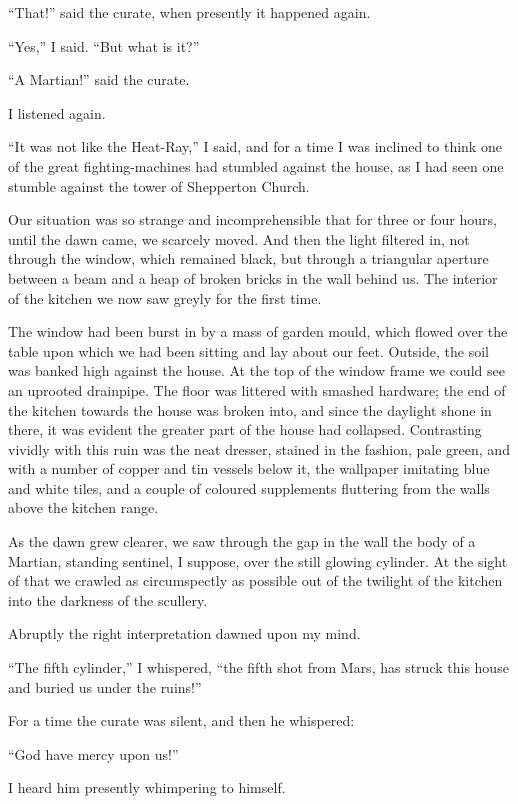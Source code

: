 ``That!'' said the curate, when presently it happened again.

``Yes,'' I said. ``But what is it?''

``A Martian!'' said the curate.

I listened again.

``It was not like the Heat-Ray,'' I said, and for a time I was
inclined to think one of the great fighting-machines had stumbled
against the house, as I had seen one stumble against the tower of
Shepperton Church.

Our situation was so strange and incomprehensible that for three or
four hours, until the dawn came, we scarcely moved. And then the
light filtered in, not through the window, which remained black,
but through a triangular aperture between a beam and a heap of
broken bricks in the wall behind us. The interior of the kitchen we
now saw greyly for the first time.

The window had been burst in by a mass of garden mould, which
flowed over the table upon which we had been sitting and lay about
our feet. Outside, the soil was banked high against the house. At
the top of the window frame we could see an uprooted drainpipe. The
floor was littered with smashed hardware; the end of the kitchen
towards the house was broken into, and since the daylight shone in
there, it was evident the greater part of the house had collapsed.
Contrasting vividly with this ruin was the neat dresser, stained in
the fashion, pale green, and with a number of copper and tin
vessels below it, the wallpaper imitating blue and white tiles, and
a couple of coloured supplements fluttering from the walls above
the kitchen range.

As the dawn grew clearer, we saw through the gap in the wall the
body of a Martian, standing sentinel, I suppose, over the still
glowing cylinder. At the sight of that we crawled as circumspectly
as possible out of the twilight of the kitchen into the darkness of
the scullery.

Abruptly the right interpretation dawned upon my mind.

``The fifth cylinder,'' I whispered, ``the fifth shot from Mars, has
struck this house and buried us under the ruins!''

For a time the curate was silent, and then he whispered:

``God have mercy upon us!''

I heard him presently whimpering to himself.

